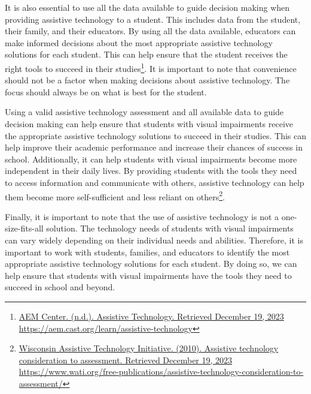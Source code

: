 \documentclass[12pt,letterpaper,twoside,openright]{report}
\begin{document}
\begin{appendices}
It is also essential to use all the data available to guide decision making when providing assistive technology to a student. This includes data from the student, their family, and their educators. By using all the data available, educators can make informed decisions about the most appropriate assistive technology solutions for each student. This can help ensure that the student receives the right tools to succeed in their studies\footnote{\raggedright \href{https://aem.cast.org/learn/assistive-technology}{AEM Center. (n.d.). Assistive Technology. Retrieved December 19, 2023} \url{https://aem.cast.org/learn/assistive-technology}}. It is important to note that convenience should not be a factor when making decisions about assistive technology. The focus should always be on what is best for the student.

Using a valid assistive technology assessment and all available data to guide decision making can help ensure that students with visual impairments receive the appropriate assistive technology solutions to succeed in their studies. This can help improve their academic performance and increase their chances of success in school. Additionally, it can help students with visual impairments become more independent in their daily lives. By providing students with the tools they need to access information and communicate with others, assistive technology can help them become more self-sufficient and less reliant on others\footnote{\raggedright \href{https://www.wati.org/free-publications/assistive-technology-consideration-to-assessment/}{Wisconsin Assistive Technology Initiative. (2010). Assistive technology consideration to assessment. Retrieved December 19, 2023} \url{https://www.wati.org/free-publications/assistive-technology-consideration-to-assessment/}}.

Finally, it is important to note that the use of assistive technology is not a one-size-fits-all solution. The technology needs of students with visual impairments can vary widely depending on their individual needs and abilities. Therefore, it is important to work with students, families, and educators to identify the most appropriate assistive technology solutions for each student. By doing so, we can help ensure that students with visual impairments have the tools they need to succeed in school and beyond.


\end{appendices}
\end{document}
